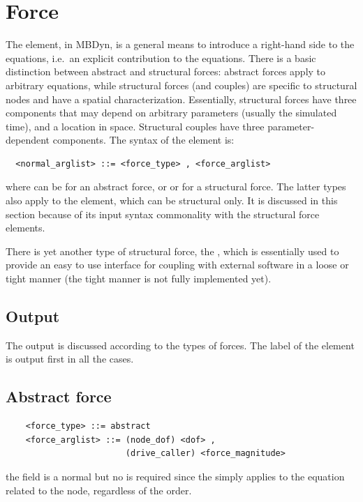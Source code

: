 \section{Force}\label{sec:EL:FORCE}
The  element, in MBDyn, is a general means to introduce 
a right-hand side to the equations, i.e.\ an explicit contribution
to the equations.
There is a basic distinction between abstract and structural forces:
abstract forces apply to arbitrary equations, while structural forces
(and couples) are specific to structural nodes and have
a spatial characterization.
Essentially, structural forces have three components
that may depend on arbitrary parameters (usually the simulated time),
and a location in space.
Structural couples have three parameter-dependent components.
The syntax of the  element is:
\begin{verbatim}
  <normal_arglist> ::= <force_type> , <force_arglist>
\end{verbatim}
where  can be  for an abstract force, or 
 or  for a structural force.
The latter types also apply to the  element,
which can be structural only.
It is discussed in this section because of its input syntax commonality 
with the structural force elements.

There is yet another type of structural force,
the , which is essentially used to provide
an easy to use interface for coupling with external software
in a loose or tight manner (the tight manner is not fully implemented yet).

\subsection{Output}
The output is discussed according to the types of forces. 
The label of the element is output first in all the cases.

\subsection{Abstract force}\label{sec:EL:FORCE:ABSTRACT}
\begin{verbatim}
    <force_type> ::= abstract 
    <force_arglist> ::= (node_dof) <dof> ,
                        (drive_caller) <force_magnitude>
\end{verbatim}
the  field is a normal  but no  is required
since the  simply applies to the equation related to the node,
regardless of the order.

